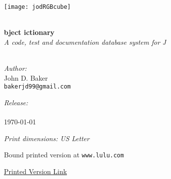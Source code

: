 \begin{titlepage}
 
\begin{center}
 
 
\texttt{[image: jodRGBcube]} 
 
\HRule \\[0.8cm]

{ \Huge \bfseries {} bject ictionary}\\[0.4cm]

\textsl{A code, test and documentation database system for J}\\[0.4cm]
 
\HRule \\[0.8cm]
 
 
\begin{minipage}{0.4\textwidth}
\begin{flushleft}
\emph{Author:}\\
John D. Baker \\
\texttt{bakerjd99@gmail.com} \\
\end{flushleft}
\end{minipage}
\begin{minipage}{0.4\textwidth}
\begin{flushright}
\emph{Release:}\\
\jodversion \\
\today \\
\end{flushright}
\end{minipage}

\vspace{0.8cm}

\emph{Print dimensions: US Letter}

Bound printed version at \texttt{www.lulu.com}

\href{http://www.lulu.com/shop/john-baker/jod-j-object-dictionary/paperback/product-20076023.html}{Printed Version Link}


\end{center}
\end{titlepage}
